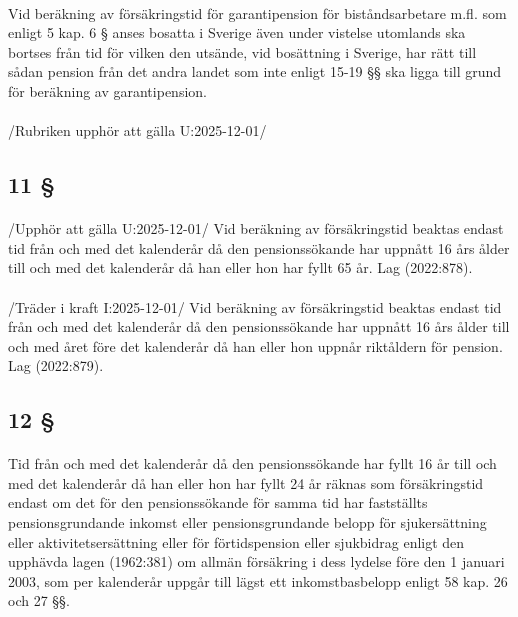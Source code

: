 \documentclass[a4paper,notitlepage,openany,10pt]{book}
\begin{document}
\paragraph*{}
Vid beräkning av försäkringstid för garantipension för biståndsarbetare m.fl. som enligt 5 kap. 6 § anses bosatta i Sverige även under vistelse utomlands ska bortses från tid för vilken den utsände, vid bosättning i Sverige, har rätt till sådan pension från det andra landet som inte enligt 15-19 §§ ska ligga till grund för beräkning av garantipension.
\paragraph*{}
/Rubriken upphör att gälla U:2025-12-01/
\subsection*{11 §}
\paragraph*{}
/Upphör att gälla U:2025-12-01/
Vid beräkning av försäkringstid beaktas endast tid från och med det kalenderår då den pensionssökande har uppnått 16 års ålder till och med det kalenderår då han eller hon har fyllt 65 år.
Lag (2022:878).
\paragraph*{}
/Träder i kraft I:2025-12-01/
Vid beräkning av försäkringstid beaktas endast tid från och med det kalenderår då den pensionssökande har uppnått 16 års ålder till och med året före det kalenderår då han eller hon uppnår riktåldern för pension.
Lag (2022:879).
\subsection*{12 §}
\paragraph*{}
Tid från och med det kalenderår då den pensionssökande har fyllt 16 år till och med det kalenderår då han eller hon har fyllt 24 år räknas som försäkringstid endast om det för den pensionssökande för samma tid har fastställts pensionsgrundande inkomst eller pensionsgrundande belopp för sjukersättning eller aktivitetsersättning eller för förtidspension eller sjukbidrag enligt den upphävda lagen (1962:381) om allmän försäkring i dess lydelse före den 1 januari 2003, som per kalenderår uppgår till lägst ett inkomstbasbelopp enligt 58 kap. 26 och 27 §§.
\end{document}

